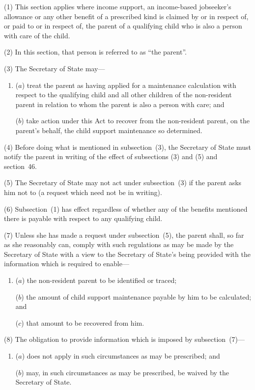 \documentclass[12pt,a4paper]{article}
\begin{document}
(1) This section applies where income support, an income-based jobseeker’s allowance or any other benefit of a prescribed kind is claimed by or in respect of, or paid to or in respect of, the parent of a qualifying child who is also a person with care of the child.

(2) In this section, that person is referred to as “the parent”.

(3) The Secretary of State may—
\begin{enumerate}\item[]
($a$) treat the parent as having applied for a maintenance calculation with respect to the qualifying child and all other children of the non-resident parent in relation to whom the parent is also a person with care; and

($b$) take action under this Act to recover from the non-resident parent, on the parent’s behalf, the child support maintenance so determined.
\end{enumerate}

(4) Before doing what is mentioned in subsection~(3), the Secretary of State must notify the parent in writing of the effect of subsections (3)  and (5)  and section~46. 

(5) The Secretary of State may not act under subsection~(3)  if the parent asks him not to (a request which need not be in writing).

(6) Subsection~(1)  has effect regardless of whether any of the benefits mentioned there is payable with respect to any qualifying child.

(7) Unless she has made a request under subsection~(5), the parent shall, so far as she reasonably can, comply with such regulations as may be made by the Secretary of State with a view to the Secretary of State’s being provided with the information which is required to enable—
\begin{enumerate}\item[]
($a$) the non-resident parent to be identified or traced;

($b$) the amount of child support maintenance payable by him to be calculated; and

($c$) that amount to be recovered from him.
\end{enumerate}

(8) The obligation to provide information which is imposed by subsection~(7)—
\begin{enumerate}\item[]
($a$) does not apply in such circumstances as may be prescribed; and

($b$) may, in such circumstances as may be prescribed, be waived by the Secretary of State.
\end{enumerate}
\end{document}
